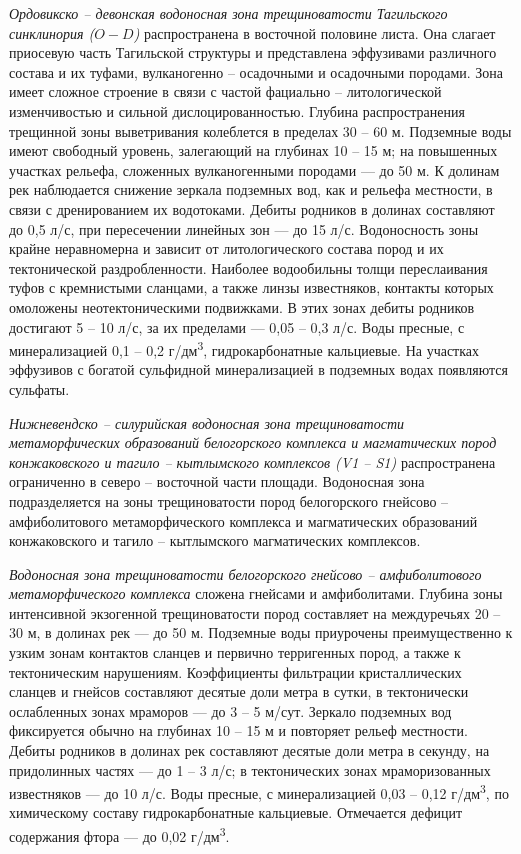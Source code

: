 \textit{Ордовикско -- девонская водоносная зона трещиноватости Тагильского синклинория ($O - D$)} распространена в восточной половине листа.
Она слагает приосевую часть Тагильской структуры и представлена эффузивами различного состава и их туфами, вулканогенно -- осадочными и осадочными породами. Зона имеет сложное строение в связи с частой фациально -- литологической изменчивостью и сильной дислоцированностью. Глубина распространения трещинной зоны выветривания колеблется в пределах 30 -- 60 м. Подземные воды имеют свободный уровень, залегающий на глубинах
10 -- 15 м; на повышенных участках рельефа, сложенных вулканогенными породами  ---  до 50 м. К долинам рек наблюдается снижение зеркала подземных
вод, как и рельефа местности, в связи с дренированием их водотоками. Дебиты родников в долинах составляют до 0,5 л/с, при пересечении линейных
зон  ---  до 15 л/с. Водоносность зоны крайне неравномерна и зависит от литологического состава пород и их тектонической раздробленности. Наиболее
водообильны толщи переслаивания туфов с кремнистыми сланцами, а также линзы известняков, контакты которых омоложены неотектоническими подвижками. В этих зонах дебиты родников достигают 5 -- 10 л/с, за их пределами  ---  0,05 -- 0,3 л/с. Воды пресные, с минерализацией 0,1 -- 0,2 г/дм\textsuperscript{3}, гидрокарбонатные кальциевые. На участках эффузивов с богатой сульфидной минерализацией в подземных водах появляются сульфаты.

\textit{Нижневендско -- силурийская водоносная зона трещиноватости метаморфических образований белогорского комплекса и магматических пород
конжаковского и тагило -- кытлымского комплексов (V1 -- S1)} распространена ограниченно в северо -- восточной части площади. Водоносная зона подразделяется на зоны трещиноватости пород белогорского гнейсово -- амфиболитового метаморфического комплекса и магматических образований конжаковского и тагило -- кытлымского магматических комплексов.

\textit{Водоносная зона трещиноватости белогорского гнейсово -- амфиболитового метаморфического комплекса} сложена гнейсами и амфиболитами. 
Глубина зоны интенсивной экзогенной трещиноватости пород составляет на междуречьях 20 -- 30 м, в долинах рек  ---  до 50 м. Подземные воды приурочены преимущественно к узким зонам контактов сланцев и первично терригенных пород, а также к тектоническим нарушениям. Коэффициенты фильтрации кристаллических сланцев и гнейсов составляют десятые доли метра в сутки, в тектонически ослабленных зонах мраморов  ---  до 3 -- 5 м/сут.
Зеркало подземных вод фиксируется обычно на глубинах 10 -- 15 м и повторяет рельеф местности. Дебиты родников в долинах рек составляют десятые
доли метра в секунду, на придолинных частях  ---  до 1 -- 3 л/с; в тектонических зонах мраморизованных известняков  ---  до 10 л/с. Воды пресные, с минерализацией 0,03 -- 0,12 г/дм\textsuperscript{3}, по химическому составу гидрокарбонатные кальциевые. Отмечается дефицит содержания фтора  ---  до 0,02 г/дм\textsuperscript{3}. 

